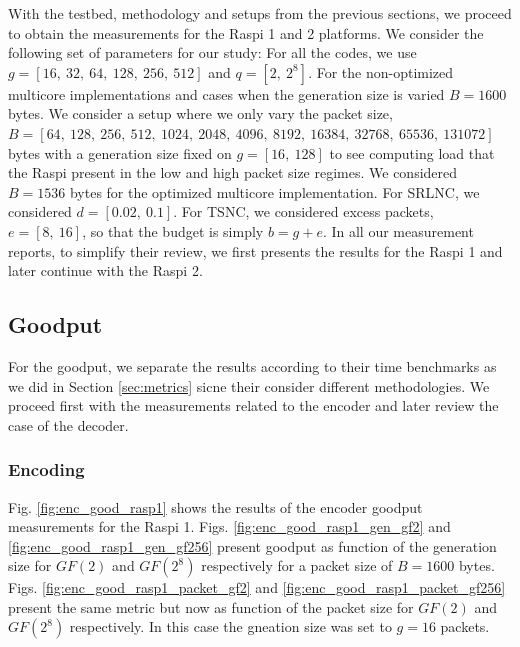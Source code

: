 \label{sec:measurements}

With the testbed, methodology and setups from the previous sections, we
proceed to obtain the measurements for the \ac{Raspi} 1 and 2 platforms.
We consider the following set of parameters for our study:
For all the codes, we use $g = [16,\ 32,\ 64,\ 128,\ 256,\ 512]$
and $q = [2,\ 2^8]$. For the non-optimized multicore implementations
and cases when the generation size is varied $B = 1600$ bytes.
We consider a setup where we only vary the packet size,
$B = [64,\ 128,\ 256,\ 512,\ 1024,\ 2048,\ 4096,\ 8192,\ 16384,\ 32768
,\ 65536,\ 131072]$ bytes with a generation size fixed on $g = [16,\ 128]$
to see computing load that the \ac{Raspi} present in the low and high
packet size regimes. We considered $B = 1536$ bytes for the optimized
multicore implementation. For \ac{SRLNC}, we considered
$d = [0.02,\ 0.1]$. For \ac{TSNC}, we considered excess packets,
$e = [8,\ 16]$, so that the budget is simply $b = g + e$. In all our
measurement reports, to simplify their review, we first presents the
results for the \ac{Raspi} 1 and later continue with the \ac{Raspi} 2.

\subsection{Goodput}
For the goodput, we separate the results according to their time benchmarks
as we did in Section \ref{sec:metrics} sicne their consider different
methodologies. We proceed first with the measurements related to the encoder
and later review the case of the decoder.

\subsubsection{Encoding}

Fig. \ref{fig:enc_good_rasp1} shows the results of the encoder goodput
measurements for the \ac{Raspi} 1. Figs. \ref{fig:enc_good_rasp1_gen_gf2}
and \ref{fig:enc_good_rasp1_gen_gf256} present goodput as function of the
generation size for $GF(2)$ and $GF(2^8)$ respectively for a packet size
of $B = 1600$ bytes. Figs. \ref{fig:enc_good_rasp1_packet_gf2} and 
\ref{fig:enc_good_rasp1_packet_gf256} present the same metric but now as
function of the packet size for $GF(2)$ and $GF(2^8)$ respectively. In this
case the gneation size was set to $g = 16$ packets.

